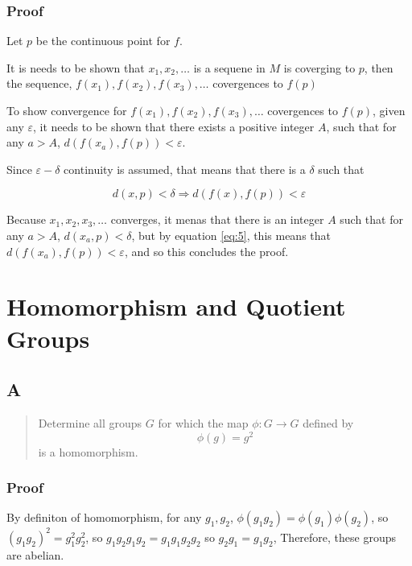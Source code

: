 \documentclass[11pt]{article}
\begin{document}
\subsubsection{Proof}
\label{sec:org903c424}
Let \(p\) be the continuous point for \(f\).

It is needs to be shown that  \(x_1, x_2, \ldots\) is a sequene in \(M\) is
coverging to \(p\), then the sequence, \(f(x_1), f(x_2), f(x_3), \ldots\)
covergences to \(f(p)\)


To show convergence for \(f(x_1), f(x_2), f(x_3), \ldots\)
covergences to \(f(p)\), given any \(\varepsilon\), it needs to be shown that there
exists a positive integer \(A\), such that for any \(a > A\), \(d(f(x_a), f(p)) < \varepsilon\).

Since \(\varepsilon -\delta\) continuity is assumed, that means that there is a
\(\delta\) such that

\begin{equation}
\label{eq:5}
d(x, p) < \delta \Rightarrow d(f(x), f(p)) < \varepsilon
\end{equation}

Because \(x_1, x_2, x_3, \ldots\) converges, it menas that there is an
integer \(A\) such that for any \(a > A\), \(d(x_{a}, p) < \delta\), but by equation
\ref{eq:5}, this means that \(d(f(x_{a}), f(p)) < \varepsilon\), and so this
concludes the proof.




\section{Homomorphism and Quotient Groups}
\label{sec:orgdcd2c9d}
\subsection{A}
\label{sec:orgd0e42fe}

\begin{quote}
Determine all groups \(G\) for which the map \(\phi : G \rightarrow G\) defined by
\begin{equation}
\label{eq:1}
\phi(g) = g^{2}
\end{equation}
is a homomorphism.
\end{quote}
\subsubsection{Proof}
\label{sec:org2d02dc0}
By definiton of homomorphism, for any \(g_1, g_2\), \(\phi(g_1 g_2) =
\phi(g_{1}) \phi(g_{2})\), so \((g_1 g_{2})^{2}  =
g_{1}^{2} g_{2}^{2}\), so \(g_1 g_2 g_1 g_2 = g_1 g_1 g_2 g_2\) so \(g_2 g_1 =
g_1 g_2\), Therefore, these groups are abelian.
\end{document}
